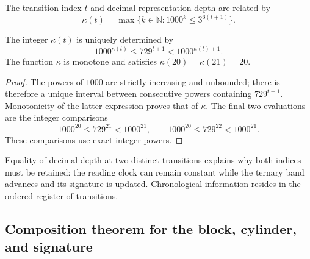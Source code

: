 \begin{definition}
The transition index \(t\) and decimal representation depth are related by
\begin{equation}
 \kappa(t)=\max\{k\in\mathbb N:1000^k\leq3^{6(t+1)}\}.
 \label{act21:eq:df-reloj}
\end{equation}
\end{definition}

\begin{proposition}
\label{act21:prop:df-reloj}
The integer \(\kappa(t)\) is uniquely determined by
\begin{equation}
 1000^{\kappa(t)}\leq729^{t+1}<1000^{\kappa(t)+1}.
 \label{act21:eq:df-reloj-cotas}
\end{equation}
The function \(\kappa\) is monotone and satisfies
\(\kappa(20)=\kappa(21)=20\).
\end{proposition}

\begin{proof}
The powers of \(1000\) are strictly increasing and unbounded; there is
therefore a unique interval between consecutive powers containing
\(729^{t+1}\). Monotonicity of the latter expression proves that of
\(\kappa\). The final two evaluations are the integer comparisons
\[
 1000^{20}\leq729^{21}<1000^{21},\qquad
 1000^{20}\leq729^{22}<1000^{21}.
\]
These comparisons use exact integer powers.
\end{proof}

Equality of decimal depth at two distinct transitions explains why both
indices must be retained: the reading clock can remain constant while
the ternary band advances and its signature is updated. Chronological
information resides in the ordered register of transitions.

\subsection{Composition theorem for the block, cylinder, and signature}

